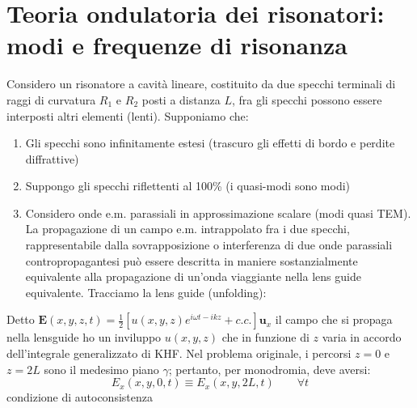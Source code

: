 \documentclass{book}
\def \*#1{\mathbf{#1}}
\theoremstyle{remark}
\begin{document}
\section{Teoria ondulatoria dei risonatori:  modi e frequenze di risonanza}
Considero un risonatore a cavità lineare, costituito da due specchi terminali di raggi di curvatura $R_1$ e $R_2$ posti a distanza $L$, fra gli specchi possono essere interposti altri elementi (lenti). Supponiamo che:
\begin{enumerate}
\item Gli specchi sono infinitamente estesi (trascuro gli effetti di bordo e perdite diffrattive)
\item  Suppongo gli specchi riflettenti al 100\% (i quasi-modi sono modi)
\item Considero onde e.m. parassiali in approssimazione scalare (modi quasi TEM). La propagazione di un campo e.m. intrappolato fra i due specchi, rappresentabile dalla sovrapposizione o interferenza di due onde parassiali contropropagantesi può essere descritta in maniere sostanzialmente equivalente alla propagazione di un'onda viaggiante nella lens guide equivalente.
Tracciamo la lens guide (unfolding):
\end{enumerate}
Detto $\*E(x,y,z,t) = \frac{1}{2} [u(x,y,z) e^{i\omega t-ikz} + c.c.] \*u_x$ il campo che si propaga nella lensguide ho un inviluppo $u(x,y,z)$ che in funzione di $z$ varia in accordo dell'integrale generalizzato di KHF. Nel problema originale, i percorsi $z=0$ e $z=2L$ sono il medesimo piano $\gamma$; pertanto, per monodromia, deve aversi:
\begin{equation*}
E_x(x,y,0,t) \equiv E_x(x,y,2L,t) \qquad \forall t
\end{equation*}
condizione di autoconsistenza
\end{document}
